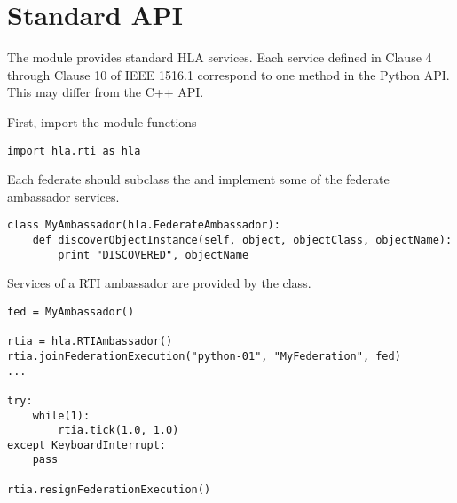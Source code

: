 \section{Standard API}

The  module provides standard HLA services.
Each service defined in Clause 4 through Clause 10 of IEEE 1516.1 correspond to
one method in the Python API. This may differ from the C++ API.

First, import the module functions
\begin{verbatim}
import hla.rti as hla
\end{verbatim}

Each federate should subclass the  and implement some
of the federate ambassador services.
\begin{verbatim}
class MyAmbassador(hla.FederateAmbassador):
    def discoverObjectInstance(self, object, objectClass, objectName):
        print "DISCOVERED", objectName
\end{verbatim}

Services of a RTI ambassador are provided by the  class.

\begin{verbatim}
fed = MyAmbassador()

rtia = hla.RTIAmbassador()
rtia.joinFederationExecution("python-01", "MyFederation", fed)
...

try:
    while(1):
        rtia.tick(1.0, 1.0)
except KeyboardInterrupt:
    pass

rtia.resignFederationExecution()
\end{verbatim}




